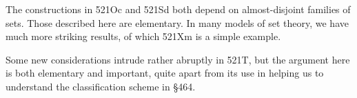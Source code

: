 {The constructions in 521Oc and 521Sd both depend on almost-disjoint
families of sets.   Those described here are elementary.   In many
models of set theory, we have much more striking results, of which
521Xm is a simple example.

Some new considerations intrude rather abruptly
in 521T, but the argument here is both elementary and important, quite
apart from its use in helping us to understand the classification
scheme in \S464.
}%

\discrpage

